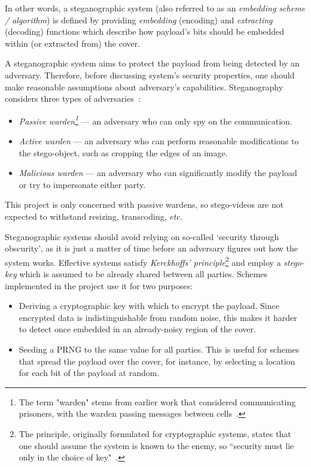 \documentclass[12pt,british,twoside,notitlepage,usenames,dvipsnames,hypens,final]{report}
\numberwithin{equation}{section}
\numberwithin{figure}{section}
\begin{document}
In other words, a steganographic system (also referred to as an \emph{embedding scheme / algorithm}) is defined by providing \emph{embedding} (encoding) and \emph{extracting} (decoding) functions which describe how payload's bits should be embedded within (or extracted from) the cover.

A steganographic system aims to protect the payload from being detected by an adversary. Therefore, before discussing system's security properties, one should make reasonable assumptions about adversary's capabilities. Steganography considers three types of adversaries~\cite{craver1998public}:
\begin{itemize}
\item \emph{Passive warden\footnote{The term "warden" stems from earlier work that considered communicating prisoners, with the warden passing messages between cells~\cite{craver1998public}.}} --- an adversary who can only spy on the communication.
\item \emph{Active warden} --- an adversary who can perform reasonable modifications to the stego-object, such as cropping the edges of an image.
\item \emph{Malicious warden} --- an adversary who can significantly modify the payload or try to impersonate either party.
\end{itemize}
This project is only concerned with passive wardens, so stego-videos are not expected to withstand resizing, transcoding, \emph{etc.}

Steganographic systems should avoid relying on so-called `security through obscurity', as it is just a matter of time before an adversary figures out how the system works. Effective systems satisfy \emph{Kerckhoffs' principle}\footnote{The principle, originally formulated for cryptographic systems, states that one should assume the system is known to the enemy, so ``security must lie only in the choice of key"~\cite{infohiding-survey}.} and employ a \emph{stego-key} which is assumed to be already shared between all parties. Schemes implemented in the project use it for two purposes:

\label{why-encrypt}
\begin{itemize}
\item Deriving a cryptographic key with which to encrypt the payload. Since encrypted data is indistinguishable from random noise, this makes it harder to detect once embedded in an already-noisy region of the cover.

\item Seeding a PRNG to the same value for all parties. This is useful for schemes that spread the payload over the cover, for instance, by selecting a location for each bit of the payload at random.
\end{itemize}
\end{document}
